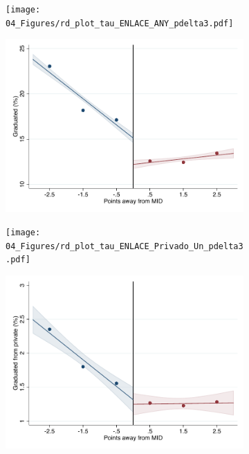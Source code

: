 \documentclass[oneside,11pt]{article}
\begin{document}
\begin{figure}[H]

    \caption{RD plots for outcome variables across those assigned to either UNAM or IPN high-school, and those who are not\label{fig:ITT_rd_plot_elite_1}}
    \begin{center}
    
    \begin{subfigure}{0.475\textwidth}
        \centering
        \texttt{[image: 04\_Figures/rd\_plot\_tau\_ENLACE\_ANY\_pdelta3.pdf]}
    \end{subfigure}
    \begin{subfigure}{0.475\textwidth}
        \centering
        \includegraphics[width=\textwidth]{04_Figures/rd_plot_mid_ENLACE_ANY_pdelta3.pdf}
    \end{subfigure}

    \begin{subfigure}{0.475\textwidth}
        \centering
        \texttt{[image: 04\_Figures/rd\_plot\_tau\_ENLACE\_Privado\_Un\_pdelta3.pdf]}
    \end{subfigure}
    \begin{subfigure}{0.475\textwidth}
        \centering
        \includegraphics[width=\textwidth]{04_Figures/rd_plot_mid_ENLACE_Privado_Un_pdelta3.pdf}
    \end{subfigure}


\end{center}
\end{figure}
\end{document}
